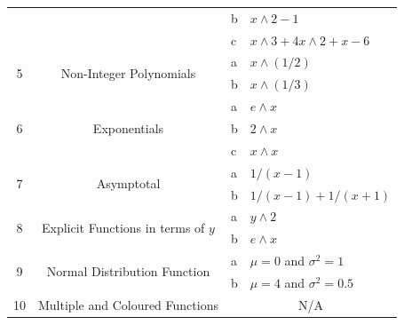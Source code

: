 \documentclass[../../../main.tex]{subfiles}
\begin{document}
\begin{table}[H]
\begin{tabular}{|c|c|l|l|}
                   &                                                            & b                                    & $x\wedge 2-1$                        \\ \cline{3-4} 
                   &                                                            & c                                    & $x\wedge 3+4x\wedge 2+x-6$                 \\ \hline
\multirow{2}{*}{5} & \multirow{2}{*}{Non-Integer Polynomials}                   & a                                    & $x\wedge (1/2)$                      \\ \cline{3-4} 
                   &                                                            & b                                    & $x\wedge (1/3)$                      \\ \hline
\multirow{3}{*}{6} & \multirow{3}{*}{Exponentials}                              & a                                    & $e\wedge x$                          \\ \cline{3-4} 
                   &                                                            & b                                    & $2\wedge x$                          \\ \cline{3-4} 
                   &                                                            & c                                    & $x\wedge x$                          \\ \hline
\multirow{2}{*}{7} & \multirow{2}{*}{Asymptotal}                                & a                                    & $1/(x-1)$                      \\ \cline{3-4} 
                   &                                                            & b                                    & $1/(x-1) + 1/(x+1)$            \\ \hline
\multirow{2}{*}{8} & \multirow{2}{*}{Explicit Functions in terms of $y$}        & a                                    & $y\wedge 2$                          \\ \cline{3-4} 
                   &                                                            & b                                    & $e\wedge x$                          \\ \hline
\multirow{2}{*}{9} & \multirow{2}{*}{Normal Distribution Function}              & a                                    & $\mu = 0$ and $\sigma^ 2 = 1$   \\ \cline{3-4} 
                   &                                                            & b                                    & $\mu = 4$ and $\sigma^ 2 = 0.5$ \\ \hline
10                 & Multiple and Coloured Functions                            & \multicolumn{2}{c|}{N/A}                                              \\ \hline
\end{tabular}
\end{table}
\end{document}
